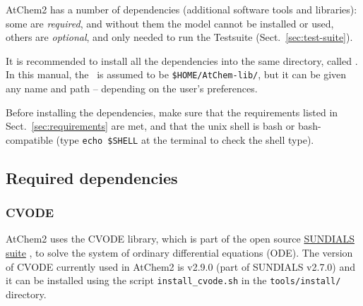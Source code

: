 AtChem2 has a number of dependencies (additional software tools and
libraries): some are \emph{required}, and without them the model
cannot be installed or used, others are \emph{optional}, and only
needed to run the Testsuite (Sect.~\ref{sec:test-suite}).

It is recommended to install all the dependencies into the same
directory, called \depdir. In this manual, the \depdir\ is assumed to
be \texttt{\$HOME/AtChem-lib/}, but it can be given any name and path
-- depending on the user's preferences.

Before installing the dependencies, make sure that the requirements
listed in Sect.~\ref{sec:requirements} are met, and that the unix
shell is bash or bash-compatible (type \verb|echo $SHELL| at the
terminal to check the shell type).

\subsection{Required dependencies} \label{subsec:required-dependencies}



\subsubsection{CVODE}

AtChem2 uses the CVODE library, which is part of the open source
\href{https://computing.llnl.gov/projects/sundials}{SUNDIALS suite}
\citep{hindmarsh_2005}, to solve the system of ordinary differential
equations (ODE). The version of CVODE currently used in AtChem2 is
v2.9.0 (part of SUNDIALS v2.7.0) and it can be installed using the
script \texttt{install\_cvode.sh} in the \texttt{tools/install/}
directory.

